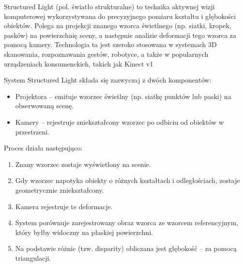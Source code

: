 \documentclass[magisterska]{pracadypl}
\begin{document}
Structured Light (pol. światło strukturalne) to technika aktywnej wizji komputerowej wykorzystywana do precyzyjnego pomiaru kształtu i głębokości obiektów. Polega na projekcji znanego wzorca świetlnego (np. siatki, kropek, pasków) na powierzchnię sceny, a następnie analizie deformacji tego wzorca za pomocą kamery. Technologia ta jest szeroko stosowana w systemach 3D skanowania, rozpoznawania gestów, robotyce, a także w popularnych urządzeniach konsumenckich, takich jak Kinect v1

System Structured Light składa się zazwyczaj z dwóch komponentów:

\begin{itemize}
  \item Projektora – emituje wzorzec świetlny (np. siatkę punktów lub paski) na obserwowaną scenę.

  \item Kamery – rejestruje zniekształcony wzorzec po odbiciu od obiektów w przestrzeni.
\end{itemize}

Proces działa następująco:

\begin{enumerate}
  \item Znany wzorzec zostaje wyświetlony na scenie.

  \item Gdy wzorzec napotyka obiekty o różnych kształtach i odległościach, zostaje geometrycznie zniekształcony.

  \item Kamera rejestruje te deformacje.

  \item System porównuje zarejestrowany obraz wzorca ze wzorcem referencyjnym, który byłby widoczny na płaskiej powierzchni.

  \item Na podstawie różnic (tzw. disparity) obliczana jest głębokość – za pomocą triangulacji.
\end{enumerate}
\end{document}
